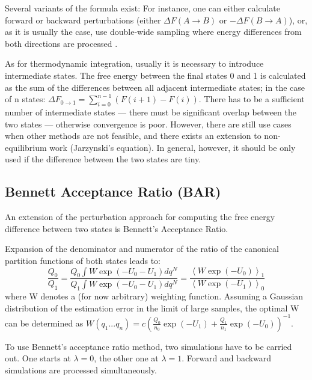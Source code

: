 Several variants of the formula exist: For instance, one can either
calculate forward or backward perturbations (either $\Delta F\left(A\rightarrow B\right)$ or
$-\Delta F\left(B\rightarrow A\right)$), or, as it is
usually the case, use double-wide sampling where energy differences
from both directions are processed \cite{Bruckner.2011}.

As for thermodynamic integration, usually it is necessary to
introduce intermediate states. The free energy between the final states
0 and 1 is calculated as the sum of the differences between all adjacent
intermediate states; in the case of n states: $\Delta F_{0\rightarrow1}=\sum_{i=0}^{n-1}\left(F\left(i+1\right)-F\left(i\right)\right)$.
There has to be a sufficient number of intermediate states --- there must be significant overlap between the two states --- otherwise convergence is poor.
However, there are still use cases when other methods are not feasible\cite{Boresch.2017},
and there exists an extension to non-equilibrium work (Jarzynski's
equation)\cite{Boresch.2017}. In general, however, it should be only used
if the difference between the two states are tiny\cite{Shirts.2013}.

\subsection{Bennett Acceptance Ratio (BAR)}

An extension of the perturbation approach for computing the free energy difference between
two states is Bennett's Acceptance Ratio\cite{Bennett.1976}. 

Expansion of the denominator and numerator of the ratio of the canonical
partition functions of both states leads to: 
\begin{equation}
\frac{Q_{0}}{Q_{1}}=\frac{Q_{0}\int W\exp\left(-U_{0}-U_{1}\right)dq^{N}}{Q_{1}\int W\exp\left(-U_{0}-U_{1}\right)dq^{N}}=\frac{\left\langle W\exp\left(-U_{0}\right)\right\rangle _{1}}{\left\langle W\exp\left(-U_{1}\right)\right\rangle _{0}}
\end{equation}
where W denotes a (for now arbitrary) weighting function. Assuming
a Gaussian distribution of the estimation error in the limit of large
samples, the optimal W can be determined as $W\left(q_{1}...q_{n}\right)=c\left(\frac{Q_{0}}{n_{0}}\exp\left(-U_{1}\right)+\frac{Q_{1}}{n_{1}}\exp\left(-U_{0}\right)\right)^{-1}$\cite{Bennett.1976}. 

To use Bennett's acceptance ratio method, two simulations have
to be carried out. One starts at $\lambda=0$, the other one at $\lambda=1$.
Forward and backward simulations are processed simultaneously. 

